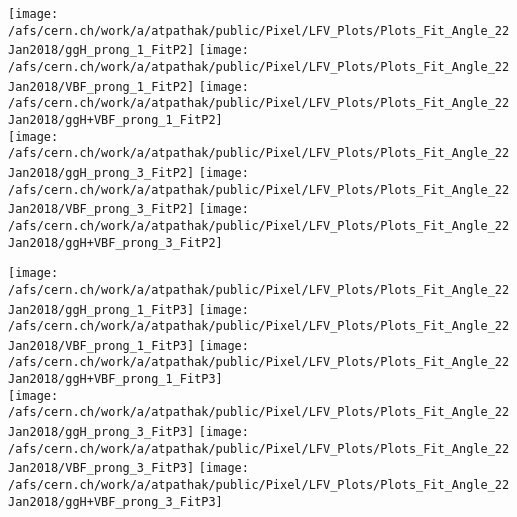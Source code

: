 \documentclass{beamer}
\begin{document}
\begin{frame}
\begin{normalsize}
\begin{center}
\texttt{[image: /afs/cern.ch/work/a/atpathak/public/Pixel/LFV\_Plots/Plots\_Fit\_Angle\_22Jan2018/ggH\_prong\_1\_FitP2]}
\texttt{[image: /afs/cern.ch/work/a/atpathak/public/Pixel/LFV\_Plots/Plots\_Fit\_Angle\_22Jan2018/VBF\_prong\_1\_FitP2]}
\texttt{[image: /afs/cern.ch/work/a/atpathak/public/Pixel/LFV\_Plots/Plots\_Fit\_Angle\_22Jan2018/ggH+VBF\_prong\_1\_FitP2]}\\
\texttt{[image: /afs/cern.ch/work/a/atpathak/public/Pixel/LFV\_Plots/Plots\_Fit\_Angle\_22Jan2018/ggH\_prong\_3\_FitP2]}
\texttt{[image: /afs/cern.ch/work/a/atpathak/public/Pixel/LFV\_Plots/Plots\_Fit\_Angle\_22Jan2018/VBF\_prong\_3\_FitP2]}
\texttt{[image: /afs/cern.ch/work/a/atpathak/public/Pixel/LFV\_Plots/Plots\_Fit\_Angle\_22Jan2018/ggH+VBF\_prong\_3\_FitP2]}
\end{center}
\end{normalsize}
\end {frame}
\begin{frame}
\begin{normalsize}
\begin{center}
\texttt{[image: /afs/cern.ch/work/a/atpathak/public/Pixel/LFV\_Plots/Plots\_Fit\_Angle\_22Jan2018/ggH\_prong\_1\_FitP3]}
\texttt{[image: /afs/cern.ch/work/a/atpathak/public/Pixel/LFV\_Plots/Plots\_Fit\_Angle\_22Jan2018/VBF\_prong\_1\_FitP3]}
\texttt{[image: /afs/cern.ch/work/a/atpathak/public/Pixel/LFV\_Plots/Plots\_Fit\_Angle\_22Jan2018/ggH+VBF\_prong\_1\_FitP3]}\\
\texttt{[image: /afs/cern.ch/work/a/atpathak/public/Pixel/LFV\_Plots/Plots\_Fit\_Angle\_22Jan2018/ggH\_prong\_3\_FitP3]}
\texttt{[image: /afs/cern.ch/work/a/atpathak/public/Pixel/LFV\_Plots/Plots\_Fit\_Angle\_22Jan2018/VBF\_prong\_3\_FitP3]}
\texttt{[image: /afs/cern.ch/work/a/atpathak/public/Pixel/LFV\_Plots/Plots\_Fit\_Angle\_22Jan2018/ggH+VBF\_prong\_3\_FitP3]}
\end{center}
\end{normalsize}
\end {frame}
\end{document}
